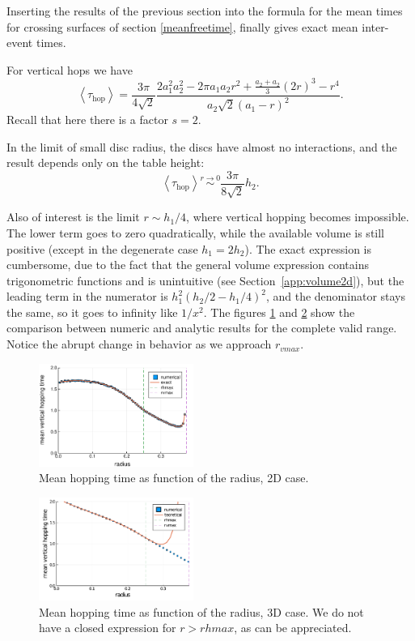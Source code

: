\documentclass[superscriptaddress,pre,reprint,showpacs,twocolumn]{revtex4-1}
\newcommand{\mean}[1]{\left \langle #1 \right \rangle}
\begin{document}
 
Inserting the results of the previous section 
into the formula for the mean times for crossing
surfaces of section \eqref{meanfreetime}, finally gives exact mean inter-event times.

For vertical
hops we have
\begin{equation}\label{hoptau}
 \mean{\tau_\text{hop}} = 	
\frac{3 \pi}{4\sqrt{2}}
\frac{2 a_1^{2} a_2^{2}  - 2 \pi a_1 a_2 r^{2} + \textstyle \frac{a_2+a_2}{3}  (2r)^{3}  -  r^4}
{ a_2 \sqrt{2}  ( a_1 - r )^2}.
\end{equation}
Recall that here there is a factor $s = 2$.

In the limit of small disc radius, the discs have almost no interactions, and the result depends only
on the table height:
\begin{equation}\label{hoptaulimit}
 \mean{\tau_\text{hop}} \overset{r \to 0}{\sim}
\frac{3 \pi}{8\sqrt{2}}h_2.
\end{equation}

Also of interest is the limit $r\sim h_1/4$, where vertical hopping becomes
impossible.  The lower term goes to zero quadratically, while the available volume
is still positive (except in the degenerate case $h_1=2h_2$). The exact expression
is cumbersome, due to the fact that the general volume expression contains trigonometric functions
 and is unintuitive (see Section~\ref{app:volume2d}),
but the leading term in the numerator is  $h_1^2(h_2/2-h_1/4)^2$, and the denominator
stays the same, so
it goes to infinity
like $1/x^2$. The figures \ref{meanhopp2d} and
\ref{meanhopp3d} show the comparison between
numeric and analytic results for the complete valid range. Notice the abrupt
change in behavior as we approach $r_{vmax}$.

\begin{figure}[h]
  \centering
  \includegraphics[width=0.45\textwidth]{./figures/verthop2d.pdf}
  \caption{Mean hopping time as function of the radius, 2D case.}\label{meanhopp2d}
\end{figure}

\begin{figure}[h]
  \centering
  \includegraphics[width=0.45\textwidth]{./figures/verthop3d.pdf}
  \caption{Mean hopping time as function of the radius, 3D case.
    We do not have a closed expression for $r>rhmax$, as can be appreciated.}
  \label{meanhopp3d}
\end{figure}
\end{document}
